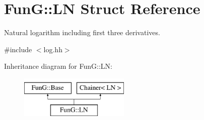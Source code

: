 \hypertarget{structFunG_1_1LN}{\section{Fun\-G\-:\-:L\-N Struct Reference}
\label{structFunG_1_1LN}
}


Natural logarithm including first three derivatives.  




{\ttfamily \#include $<$log.\-hh$>$}

Inheritance diagram for Fun\-G\-:\-:L\-N\-:\begin{figure}[H]
\begin{center}
\leavevmode
\includegraphics[height=2.000000cm]{structFunG_1_1LN}
\end{center}
\end{figure}
